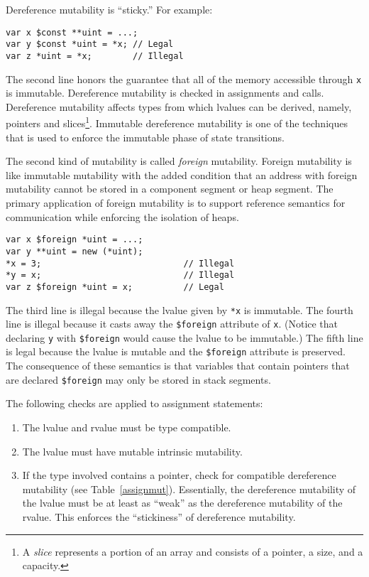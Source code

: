 Dereference mutability is ``sticky.''
For example:
\begin{verbatim}
var x $const **uint = ...;
var y $const *uint = *x; // Legal
var z *uint = *x;        // Illegal
\end{verbatim}
The second line honors the guarantee that all of the memory accessible through \verb+x+ is immutable.
Dereference mutability is checked in assignments and calls.
Dereference mutability affects types from which lvalues can be derived, namely, pointers and slices\footnote{A \emph{slice} represents a portion of an array and consists of a pointer, a size, and a capacity.}.
Immutable dereference mutability is one of the techniques that is used to enforce the immutable phase of state transitions.

The second kind of mutability is called \emph{foreign} mutability.
Foreign mutability is like immutable mutability with the added condition that an address with foreign mutability cannot be stored in a component segment or heap segment.
The primary application of foreign mutability is to support reference semantics for communication while enforcing the isolation of heaps.
\begin{verbatim}
var x $foreign *uint = ...;
var y **uint = new (*uint);
*x = 3;                            // Illegal
*y = x;                            // Illegal
var z $foreign *uint = x;          // Legal
\end{verbatim}
The third line is illegal because the lvalue given by \verb+*x+ is immutable.
The fourth line is illegal because it casts away the \verb|$foreign| attribute of \verb+x+.
(Notice that declaring \verb+y+ with \verb|$foreign| would cause the lvalue to be immutable.)
The fifth line is legal because the lvalue is mutable and the \verb|$foreign| attribute is preserved.
The consequence of these semantics is that variables that contain pointers that are declared \verb|$foreign| may only be stored in stack segments.


The following checks are applied to assignment statements:
\begin{enumerate}
\item The lvalue and rvalue must be type compatible.
\item The lvalue must have mutable intrinsic mutability.
\item If the type involved contains a pointer, check for compatible dereference mutability (see Table~\ref{assignmut}).
  Essentially, the dereference mutability of the lvalue must be at least as ``weak'' as the dereference mutability of the rvalue.
  This enforces the ``stickiness'' of dereference mutability.
\end{enumerate}

